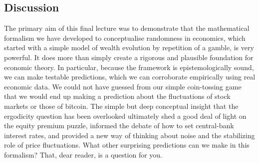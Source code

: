 \subsection{Discussion}
The primary aim of this final lecture was to demonstrate that the mathematical formalism we have developed to conceptualise randomness in economics, which started with a simple model of wealth evolution by repetition of a gamble, is very powerful. It does more than simply create a rigorous and plausible foundation for economic theory. In particular, because the framework is epistemologically sound, we can make testable predictions, which we can corroborate empirically using real economic data. We could not have guessed from our simple coin-tossing game that we would end up making a prediction about the fluctuations of stock markets or those of bitcoin. The simple but deep conceptual insight that the ergodicity question has been overlooked ultimately shed a good deal of light on the equity premium puzzle, informed the debate of how to set central-bank interest rates, and provided a new way of thinking about noise and the stabilizing role of price fluctuations. What other surprising predictions can we make in this formalism? That, dear reader, is a question for you.

